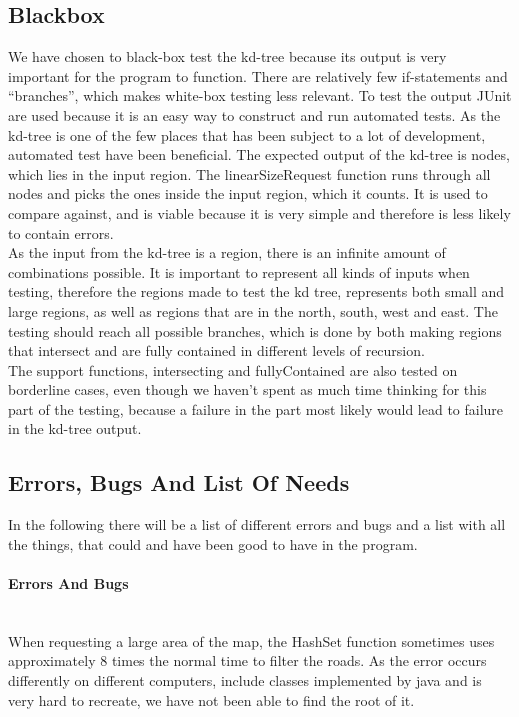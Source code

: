 \documentclass[a4paper,10pt,titlepage]{article}
\begin{document}
		\subsection{Blackbox}
		We have chosen to black-box test the kd-tree because its output is very important for the program to function. There are relatively few if-statements and “branches”, which makes white-box testing less relevant.
To test the output JUnit are used because it is an easy way to construct and run automated tests. As the kd-tree is one of the few places that has been subject to a lot of development, automated test have been beneficial. The expected output of the kd-tree is nodes, which lies in the input region. The linearSizeRequest function runs through all nodes and picks the ones inside the input region, which it counts. It is used to compare against, and is viable because it is very simple and therefore is less likely to contain errors.\\
As the input from the kd-tree is a region, there is an infinite amount of combinations possible. It is important to represent all kinds of inputs when testing, therefore the regions made to test the kd tree, represents both small and large regions, as well as regions that are in the north, south, west and east. The testing should reach all possible branches, which is done by both making regions that intersect and are fully contained in different levels of recursion.\\
The support functions, intersecting and fullyContained are also tested on borderline cases, even though we haven’t spent as much time thinking for this part of the testing, because a failure in the part most likely would lead to failure in the kd-tree output.\\

			
		\subsection{Errors, Bugs And List Of Needs}

		In the following there will be a list of different errors and bugs and a list with all the things, that could and have been good to have in the program.
		\paragraph{Errors And Bugs}\mbox{}\\
		
When requesting a large area of the map, the HashSet function sometimes uses approximately 8 times the normal time to filter the roads. As the error occurs differently on different computers, include classes implemented by java and is very hard to recreate, we have not been able to find the root of it.\\
\end{document}
